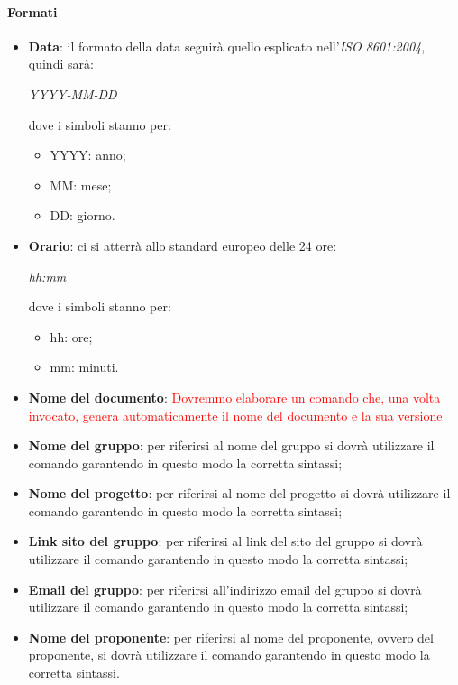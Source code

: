 \paragraph{Formati}
\begin{itemize}
	\item \textbf{Data}: il formato della data seguirà quello esplicato nell'\emph{ISO 8601:2004}, quindi sarà: 
	\begin{center}
		\emph{YYYY-MM-DD}
	\end{center}
	dove i simboli stanno per:
	\begin{itemize}
		\item YYYY: anno;
		\item MM: mese;
		\item DD: giorno.
	\end{itemize}
	\item \textbf{Orario}: ci si atterrà allo standard europeo delle 24 ore:
	 \begin{center}
	 	\emph{hh:mm}
	 \end{center}
 	dove i simboli stanno per:
 	\begin{itemize}
 		\item hh: ore;
 		\item mm: minuti.
 	\end{itemize}
	\item \textbf{Nome del documento}: \textcolor{red}{Dovremmo elaborare un comando che, una volta invocato, genera automaticamente il nome del documento e la sua versione}
	\item \textbf{Nome del gruppo}: per riferirsi al nome del gruppo si dovrà
	utilizzare il comando garantendo in questo modo la corretta sintassi;
	\item \textbf{Nome del progetto}: per riferirsi al nome del progetto si dovrà
	utilizzare il comando garantendo in questo modo la corretta sintassi;
	\item \textbf{Link sito del gruppo}: per riferirsi al link del sito del gruppo si dovrà
	utilizzare il comando garantendo in questo modo la corretta sintassi;
	\item \textbf{Email del gruppo}: per riferirsi all'indirizzo email del gruppo si dovrà
	utilizzare il comando garantendo in questo modo la corretta sintassi;
	\item \textbf{Nome del proponente}: per riferirsi al nome del proponente, ovvero del proponente, si dovrà
	utilizzare il comando garantendo in questo modo la corretta
	sintassi.
\end{itemize}
